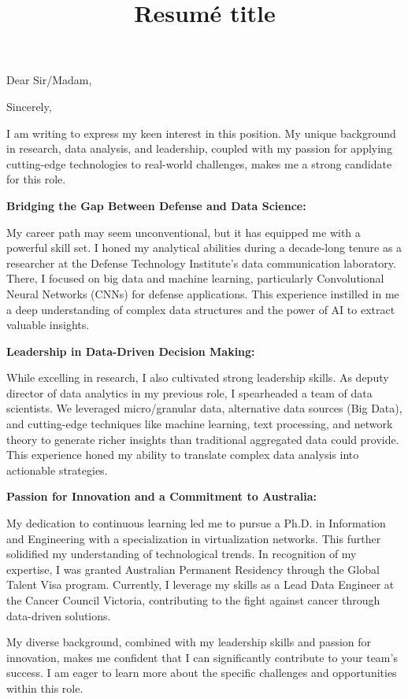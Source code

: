 \documentclass[10pt,a4paper,roman]{moderncv}
\title{Resumé title}
\begin{document}
\recipient{}{}
\opening{Dear Sir/Madam,}
\closing{Sincerely,}
\makelettertitle

I am writing to express my keen interest in this position. My unique background in research, data analysis, and leadership, coupled with my passion for applying cutting-edge technologies to real-world challenges, makes me a strong candidate for this role.

\textbf{Bridging the Gap Between Defense and Data Science:}

My career path may seem unconventional, but it has equipped me with a powerful skill set. I honed my analytical abilities during a decade-long tenure as a researcher at the Defense Technology Institute's data communication laboratory. There, I focused on big data and machine learning, particularly Convolutional Neural Networks (CNNs) for defense applications. This experience instilled in me a deep understanding of complex data structures and the power of AI to extract valuable insights.

\textbf{Leadership in Data-Driven Decision Making:}

While excelling in research, I also cultivated strong leadership skills. As deputy director of data analytics in my previous role, I spearheaded a team of data scientists. We leveraged micro/granular data, alternative data sources (Big Data), and cutting-edge techniques like machine learning, text processing, and network theory to generate richer insights than traditional aggregated data could provide. This experience honed my ability to translate complex data analysis into actionable strategies.

\textbf{Passion for Innovation and a Commitment to Australia:}

My dedication to continuous learning led me to pursue a Ph.D. in Information and Engineering with a specialization in virtualization networks. This further solidified my understanding of technological trends. In recognition of my expertise, I was granted Australian Permanent Residency through the Global Talent Visa program. Currently, I leverage my skills as a Lead Data Engineer at the Cancer Council Victoria, contributing to the fight against cancer through data-driven solutions.

My diverse background, combined with my leadership skills and passion for innovation, makes me confident that I can significantly contribute to your team's success. I am eager to learn more about the specific challenges and opportunities within this role.

\makeletterclosing
\end{document}
